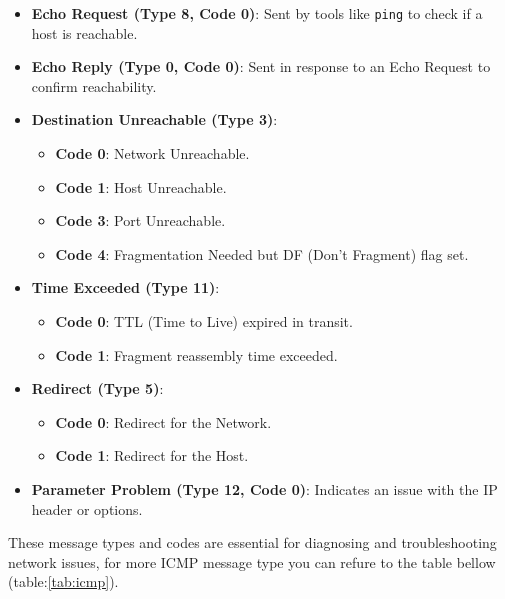\begin{itemize}
	\item \textbf{Echo Request (Type 8, Code 0)}: Sent by tools like \texttt{ping} to check if a host is reachable.
	\item \textbf{Echo Reply (Type 0, Code 0)}: Sent in response to an Echo Request to confirm reachability.
	\item \textbf{Destination Unreachable (Type 3)}:
	\begin{itemize}
		\item \textbf{Code 0}: Network Unreachable.
		\item \textbf{Code 1}: Host Unreachable.
		\item \textbf{Code 3}: Port Unreachable.
		\item \textbf{Code 4}: Fragmentation Needed but DF (Don't Fragment) flag set.
	\end{itemize}
	\item \textbf{Time Exceeded (Type 11)}:
	\begin{itemize}
		\item \textbf{Code 0}: TTL (Time to Live) expired in transit.
		\item \textbf{Code 1}: Fragment reassembly time exceeded.
	\end{itemize}
	\item \textbf{Redirect (Type 5)}:
	\begin{itemize}
		\item \textbf{Code 0}: Redirect for the Network.
		\item \textbf{Code 1}: Redirect for the Host.
	\end{itemize}
	\item \textbf{Parameter Problem (Type 12, Code 0)}: Indicates an issue with the IP header or options.
\end{itemize}

These message types and codes are essential for diagnosing and troubleshooting network issues, for more ICMP message type you can refure to the table bellow (table:\ref{tab:icmp}).

